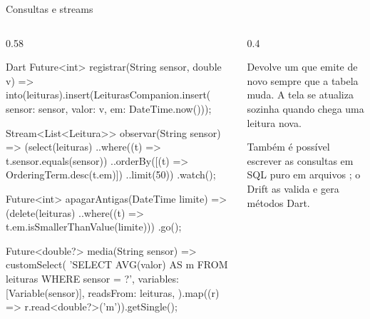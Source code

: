 \documentclass[aspectratio=169,10pt]{beamer}
\begin{document}
\begin{frame}[fragile]{Consultas e streams}
  \begin{columns}[T]
    \begin{column}{0.58\textwidth}
\begin{codigo}[title=Dentro de BancoApp (ou de um DAO)]{Dart}
Future<int> registrar(String sensor, double v) =>
    into(leituras).insert(LeiturasCompanion.insert(
        sensor: sensor, valor: v, em: DateTime.now()));

Stream<List<Leitura>> observar(String sensor) =>
    (select(leituras)
          ..where((t) => t.sensor.equals(sensor))
          ..orderBy([(t) => OrderingTerm.desc(t.em)])
          ..limit(50))
        .watch();

Future<int> apagarAntigas(DateTime limite) =>
    (delete(leituras)
          ..where((t) => t.em.isSmallerThanValue(limite)))
        .go();

Future<double?> media(String sensor) => customSelect(
    'SELECT AVG(valor) AS m FROM leituras WHERE sensor = ?',
    variables: [Variable(sensor)], readsFrom: {leituras},
  ).map((r) => r.read<double?>('m')).getSingle();
\end{codigo}
    \end{column}
    \begin{column}{0.4\textwidth}
      \begin{conceito}
        Devolve um  que emite de novo sempre que a tabela muda. A tela se atualiza sozinha quando chega uma leitura nova.
      \end{conceito}
      \begin{dica}
        Também é possível escrever as consultas em SQL puro em arquivos ; o Drift as valida e gera métodos Dart.
      \end{dica}
    \end{column}
  \end{columns}
\end{frame}
\end{document}
